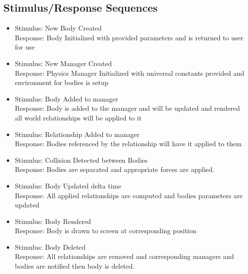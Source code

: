 \documentclass{scrreprt}
\begin{document}
\subsection{Stimulus/Response Sequences}
\begin{itemize}

\item Stimulus:		New Body Created\\
Response: 		Body Initialized with provided parameters and is returned to user for use\\

\item Stimulus:		New Manager Created \\
Response: 		Physics Manager  Initialized with universal constants provided and environment for bodies is setup\\

\item Stimulus:		Body Added to manager\\
Response: 		Body is added to the manager and will be updated and rendered all world relationships will be applied to it\\

\item Stimulus:		Relationship Added to manager\\
Response: 		Bodies referenced by the relationship will have it applied to them\\

\item Stimulus:		Collision Detected between Bodies\\
Response: 		Bodies are separated and appropriate forces are applied.\\

\item Stimulus:		Body Updated delta time\\
Response: 		All applied relationships are computed and bodies parameters are updated\\

\item Stimulus:		Body Rendered\\
Response: 		Body is drawn to screen at corresponding position\\

\item Stimulus:		Body Deleted\\
Response: 		All relationships are removed and corresponding managers and bodies are notified then body is deleted.\\
\end{itemize}
\end{document}
